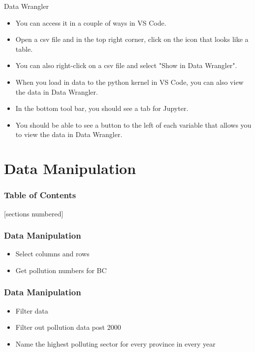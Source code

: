 \documentclass[serif, 9pt, aspectratio=32]{beamer}
\begin{document}
\begin{frame}{Data Wrangler}
    \begin{itemize}
        \setlength{\itemsep}{3em}
        \item You can access it in a couple of ways in VS Code.
        \item Open a csv file and in the top right corner, click on the icon that looks like a table.
        \item You can also right-click on a csv file and select "Show in Data Wrangler".
    \end{itemize}
\end{frame}

\begin{frame}
    \begin{itemize}
        \setlength{\itemsep}{3em}
        \item When you load in data to the python kernel in VS Code, you can also view the data in Data Wrangler.
        \item In the bottom tool bar, you should see a tab for Jupyter.
        \item You should be able to see a button to the left of each variable that allows you to view the data in Data Wrangler.
    \end{itemize}
\end{frame}

\section{Data Manipulation}

\begin{frame}
    \frametitle{Table of Contents}
    [sections numbered]
    \tableofcontents[currentsection]
\end{frame}

\begin{frame}
    \centering
    \frametitle{Data Manipulation}
    \begin{itemize}
        \setlength{\itemsep}{2em}
        \item Select columns and rows
        \item Get pollution numbers for BC
    \end{itemize}
\end{frame}

\begin{frame}
    \centering
    \frametitle{Data Manipulation}
    \begin{itemize}
        \setlength{\itemsep}{2em}
        \item Filter data
        \item Filter out pollution data post 2000
        \item Name the highest polluting sector for every province in every year
    \end{itemize}
\end{frame}
\end{document}
